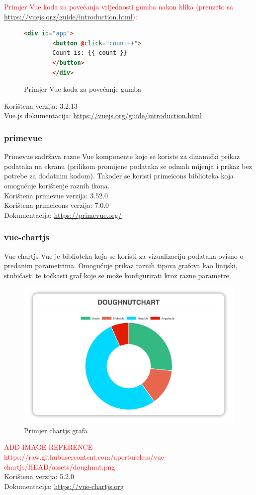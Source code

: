 \documentclass[zavrsnirad]{fer}
\begin{document}
\textcolor{red}{Primjer Vue koda za povećanja vrijednosti gumba nakon klika (preuzeto sa \url{https://vuejs.org/guide/introduction.html}):}
\begin{figure}[htb]
	\centering
	\begin{lstlisting}[language=html]
		<div id="app">
		<button @click="count++">
		Count is: {{ count }}
		</button>
		</div>
	\end{lstlisting}
	\caption{Primjer Vue koda za povećanje gumba}
\end{figure}
\FloatBarrier

Korištena verzija: 3.2.13
\\Vue.js dokumentacija: \url{https://vuejs.org/guide/introduction.html}

\subsubsection{primevue}
Primevue sadržava razne Vue komponente koje se koriste za dinamički prikaz podataka na ekranu (prilikom promijene podataka se odmah mijenja i prikaz bez potrebe za dodatnim kodom). Također se koristi primeicons biblioteka koja omogućuje korištenje raznih ikona.
\\Korištena primevue verzija: 3.52.0
\\Korištena primeicons verzija: 7.0.0
\\Dokumentacija: \url{https://primevue.org/}

\subsubsection{vue-chartjs}
\label{pog:chart.vue}
Vue-chartjs Vue je biblioteka koja se koristi za vizualizaciju podataka ovisno o predanim parametrima. Omogućuje prikaz raznih tipova grafova kao linijski, stubičasti te točkasti graf koje se može konfigurirati kroz razne parametre.
\begin{figure}[htb]
	\centering
	\includegraphics[width=0.9\linewidth]{images/chartjs_example.png} 
	\caption{Primjer chartjs grafa}
	\label{slk:chartjs_example}
\end{figure}
\FloatBarrier
\textcolor{red}{ADD IMAGE REFERENCE https://raw.githubusercontent.com/apertureless/vue-chartjs/HEAD/assets/doughnut.png}
\\Korištena verzija: 5.2.0
\\Dokumentacija: \url{https://vue-chartjs.org}
\end{document}
